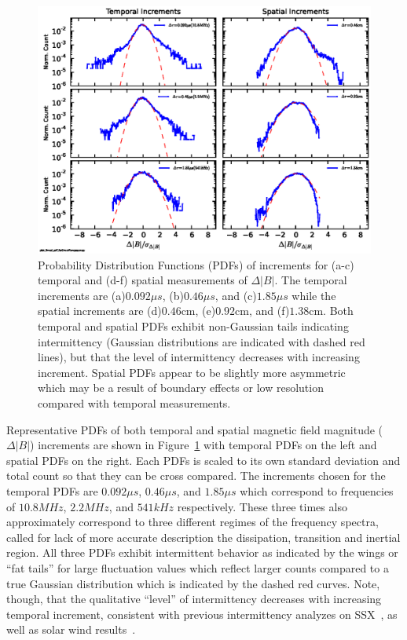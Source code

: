 \documentclass[preprint2]{aastex}
\begin{document}
\begin{figure}
\includegraphics{fig1.eps}
\caption{\label{fig:pdfs}Probability Distribution Functions (PDFs) of increments for (a-c) temporal and (d-f) spatial measurements of $\Delta |B|$. The temporal increments are (a)$0.092\mu s$, (b)$0.46\mu s$, and (c)$1.85\mu s$ while the spatial increments are (d)$0.46$cm, (e)$0.92$cm, and (f)$1.38$cm. Both temporal and spatial PDFs exhibit non-Gaussian tails indicating intermittency (Gaussian distributions are indicated with dashed red lines), but that the level of intermittency decreases with increasing increment. Spatial PDFs appear to be slightly more asymmetric which may be a result of boundary effects or low resolution compared with temporal measurements.}
\end{figure}

Representative PDFs of both temporal and spatial magnetic field magnitude ($\Delta |B|$) increments are shown in Figure~\ref{fig:pdfs} with temporal PDFs on the left and spatial PDFs on the right. Each PDFs is scaled to its own standard deviation and total count so that they can be cross compared. The increments chosen for the temporal PDFs are $0.092\mu s$, $0.46\mu s$, and $1.85\mu s$ which correspond to frequencies of $10.8MHz$, $2.2MHz$, and $541kHz$ respectively. These three times also approximately correspond to three different regimes of the frequency spectra, called for lack of more accurate description the dissipation, transition and inertial region. All three PDFs exhibit intermittent behavior as indicated by the wings or ``fat tails'' for large fluctuation values which reflect larger counts compared to a true Gaussian distribution which is indicated by the dashed red curves. Note, though, that the qualitative ``level'' of intermittency decreases with increasing temporal increment, consistent with previous intermittency analyzes on SSX~\citep{schaffner2014a,schaffner2014b}, as well as solar wind results~\citep{bruno2013}.
\end{document}
